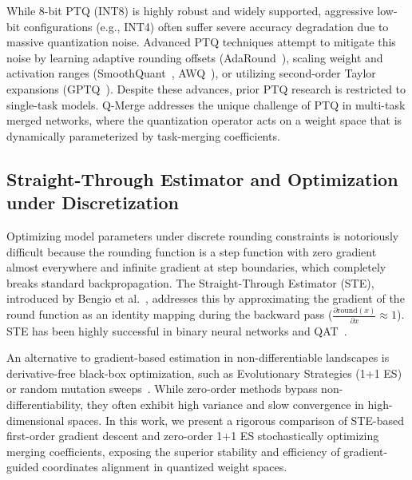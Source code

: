 While 8-bit PTQ (INT8) is highly robust and widely supported, aggressive low-bit configurations (e.g., INT4) often suffer severe accuracy degradation due to massive quantization noise. Advanced PTQ techniques attempt to mitigate this noise by learning adaptive rounding offsets (AdaRound~\cite{nagel2020adaround}), scaling weight and activation ranges (SmoothQuant~\cite{xiao2023smoothquant}, AWQ~\cite{lin2023awq}), or utilizing second-order Taylor expansions (GPTQ~\cite{frantar2022gptq}). Despite these advances, prior PTQ research is restricted to single-task models. Q-Merge addresses the unique challenge of PTQ in multi-task merged networks, where the quantization operator acts on a weight space that is dynamically parameterized by task-merging coefficients.

\subsection{Straight-Through Estimator and Optimization under Discretization}
Optimizing model parameters under discrete rounding constraints is notoriously difficult because the rounding function is a step function with zero gradient almost everywhere and infinite gradient at step boundaries, which completely breaks standard backpropagation. The Straight-Through Estimator (STE), introduced by Bengio et al.~\cite{bengio2013estimating}, addresses this by approximating the gradient of the round function as an identity mapping during the backward pass ($\frac{\partial \text{round}(x)}{\partial x} \approx 1$). STE has been highly successful in binary neural networks and QAT~\cite{jacob2018quantization}. 

An alternative to gradient-based estimation in non-differentiable landscapes is derivative-free black-box optimization, such as Evolutionary Strategies (1+1 ES) or random mutation sweeps~\cite{akiba2024evolutionary, yang2024adamerging}. While zero-order methods bypass non-differentiability, they often exhibit high variance and slow convergence in high-dimensional spaces. In this work, we present a rigorous comparison of STE-based first-order gradient descent and zero-order 1+1 ES stochastically optimizing merging coefficients, exposing the superior stability and efficiency of gradient-guided coordinates alignment in quantized weight spaces.

